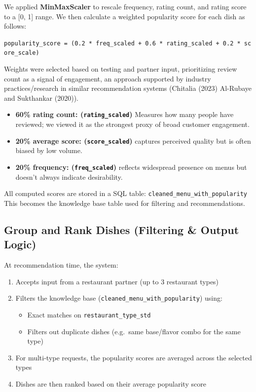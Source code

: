 \documentclass[
  11pt,
  a4paper,
  DIV=11,
  numbers=noendperiod]{scrartcl}
\providecommand{\tightlist}{%
  \setlength{\itemsep}{0pt}\setlength{\parskip}{0pt}}\usepackage{longtable,booktabs,array}
\begin{document}
We applied \textbf{MinMaxScaler} to rescale frequency, rating count, and
rating score to a {[}0, 1{]} range. We then calculate a weighted
popularity score for each dish as follows:

\texttt{popularity\_score\ =\ (0.2\ *\ freq\_scaled\ +\ 0.6\ *\ rating\_scaled\ +\ 0.2\ *\ score\_scale)}

Weights were selected based on testing and partner input, prioritizing
review count as a signal of engagement, an approach supported by
industry practices/research in similar recommendation systems (Chitalia
(2023) Al-Rubaye and Sukthankar (2020)).

\begin{itemize}
\tightlist
\item
  \textbf{60\% rating count: (\texttt{rating\_scaled})} Measures how
  many people have reviewed; we viewed it as the strongest proxy of
  broad customer engagement.
\item
  \textbf{20\% average score: (\texttt{score\_scaled})} captures
  perceived quality but is often biased by low volume.
\item
  \textbf{20\% frequency: (\texttt{freq\_scaled})} reflects widespread
  presence on menus but doesn't always indicate desirability.
\end{itemize}

All computed scores are stored in a SQL table:
\texttt{cleaned\_menu\_with\_popularity} This becomes the knowledge base
table used for filtering and recommendations.

\subsection{Group and Rank Dishes (Filtering \& Output
Logic)}\label{group-and-rank-dishes-filtering-output-logic}

At recommendation time, the system:

\begin{enumerate}
\def\labelenumi{\arabic{enumi}.}
\tightlist
\item
  Accepts input from a restaurant partner (up to 3 restaurant types)
\item
  Filters the knowledge base (\texttt{cleaned\_menu\_with\_popularity})
  using:

  \begin{itemize}
  \tightlist
  \item
    Exact matches on \texttt{restaurant\_type\_std}
  \item
    Filters out duplicate dishes (e.g.~same base/flavor combo for the
    same type)
  \end{itemize}
\item
  For multi-type requests, the popularity scores are averaged across the
  selected types
\item
  Dishes are then ranked based on their average popularity score
\end{enumerate}
\end{document}
